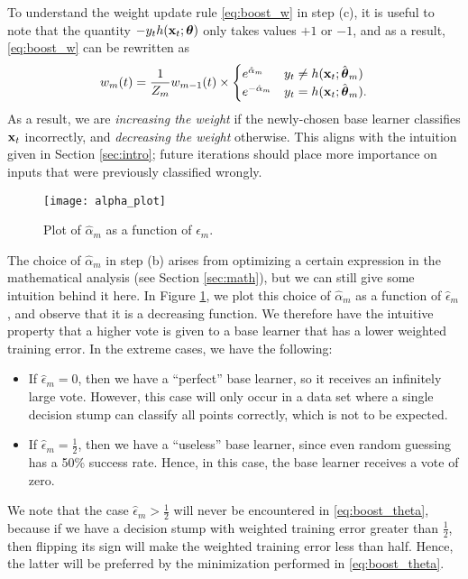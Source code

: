 \documentclass[english]{article}
\begin{document}
To understand the weight update rule \eqref{eq:boost_w} in step (c), it is useful to note that the quantity $-y_t h(\mathbf{x}_t;\boldsymbol{\theta})$ only takes values $+1$ or $-1$, and as a result, \eqref{eq:boost_w} can be rewritten as 
    \begin{equation}
        w_m(t) = \frac{1}{Z_m} w_{m-1}(t) \times
        \begin{cases}
            e^{\hat{\alpha}_m} & y_t \ne h(\mathbf{x}_t;\hat{\boldsymbol{\theta}}_m) \\
            e^{-\hat{\alpha}_m} & y_t = h(\mathbf{x}_t;\hat{\boldsymbol{\theta}}_m).
        \end{cases} \label{eq:update}
    \end{equation}
As a result, we are {\em increasing the weight} if the newly-chosen base learner classifies $\mathbf{x}_t$ incorrectly, and {\em decreasing the weight} otherwise.  This aligns with the intuition given in Section \ref{sec:intro}; future iterations should place more importance on inputs that were previously classified wrongly. 

    \begin{figure}
        \centering
        \texttt{[image: alpha\_plot]}
        \par
        \caption{Plot of $\hat{\alpha}_m$ as a function of $\hat{\epsilon}_m$. \label{fig:alpha_plot}}
    \end{figure}   

The choice of $\hat{\alpha}_m$ in step (b) arises from optimizing a certain expression in the mathematical analysis (see Section \ref{sec:math}), but we can still give some intuition behind it here.  In Figure \ref{fig:alpha_plot}, we plot this choice of $\hat{\alpha}_m$ as a function of $\hat{\epsilon}_m$, and observe that it is a decreasing function.  We therefore have the intuitive property that a higher vote is given to a base learner that has a lower weighted training error.  In the extreme cases, we have the following:
\begin{itemize}
    \item If $\hat{\epsilon}_m = 0$, then we have a ``perfect'' base learner, so it receives an infinitely large vote.  However, this case will only occur in a data set where a single decision stump can classify all points correctly, which is not to be expected.
    \item If $\hat{\epsilon}_m = \frac{1}{2}$, then we have a ``useless'' base learner, since even random guessing has a 50\% success rate.  Hence, in this case, the base learner receives a vote of zero.
\end{itemize}
We note that the case $\hat{\epsilon}_m > \frac{1}{2}$ will never be encountered in \eqref{eq:boost_theta}, because if we have a decision stump with weighted training error greater than $\frac{1}{2}$, then flipping its sign will make the weighted training error less than half.  Hence, the latter will be preferred by the minimization performed in \eqref{eq:boost_theta}.
\end{document}

